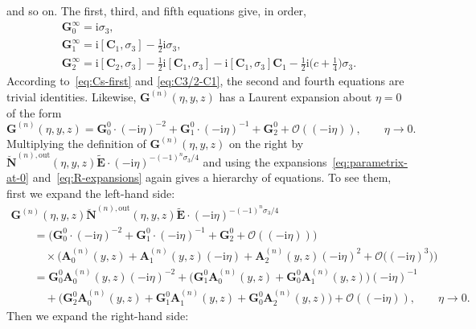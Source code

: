\documentclass[11pt]{article}
\numberwithin{equation}{section}
\numberwithin{equation}{section}
\begin{document}
and so on. The first, third, and fifth equations give, in order,
\begin{gather*}
\mathbf{G}_0^\infty=\mathrm{i}\sigma_3,\\
\mathbf{G}_1^\infty=\mathrm{i}[\mathbf{C}_1,\sigma_3]-\tfrac{1}{2}\mathrm{i}\sigma_3,\\
\mathbf{G}_2^\infty=\mathrm{i}[\mathbf{C}_2,\sigma_3]-\tfrac{1}{2}\mathrm{i}[\mathbf{C}_1,\sigma_3]-\mathrm{i}[\mathbf{C}_1,\sigma_3]\mathbf{C}_1-\tfrac{1}{2}\mathrm{i}\bigl(c+\tfrac{1}{4}\bigr)\sigma_3.
\end{gather*}
According to~\eqref{eq:Cs-first} and \eqref{eq:C3/2-C1}, the second and fourth equations are trivial identities. Likewise, $\mathbf{G}^{(n)}(\eta,y,z)$ has a Laurent expansion about $\eta=0$ of the form
\begin{equation*}
\mathbf{G}^{(n)}(\eta,y,z)=\mathbf{G}^0_0\cdot (-\mathrm{i}\eta)^{-2} +\mathbf{G}^0_1\cdot (-\mathrm{i}\eta)^{-1} + \mathbf{G}^0_2 + \mathcal{O}((-\mathrm{i}\eta)),\qquad\eta\to 0.
\end{equation*}
Multiplying the definition of $\mathbf{G}^{(n)}(\eta,y,z)$ on the right by $\breve{\mathbf{N}}^{(n),\mathrm{out}}(\eta,y,z)\widetilde{\mathbf{E}}\cdot(-\mathrm{i}\eta)^{-(-1)^n\sigma_3/4}$ and using the expansions~\eqref{eq:parametrix-at-0} and~\eqref{eq:R-expansions} again gives a hierarchy of equations. To see them, first we expand the left-hand side:
\begin{gather*}
\mathbf{G}^{(n)}(\eta,y,z)\breve{\mathbf{N}}^{(n),\mathrm{out}}(\eta,y,z)\widetilde{\mathbf{E}}\cdot(-\mathrm{i}\eta)^{-(-1)^n\sigma_3/4}\\
\qquad{}=\bigl(\mathbf{G}^0_0\cdot (-\mathrm{i}\eta)^{-2} +\mathbf{G}^0_1\cdot (-\mathrm{i}\eta)^{-1} + \mathbf{G}^0_2 + \mathcal{O}((-\mathrm{i}\eta))\bigr)\\
\qquad\quad{}\times\bigl(\mathbf{A}_0^{(n)}(y,z) + \mathbf{A}_1^{(n)}(y,z)(-\mathrm{i}\eta) + \mathbf{A}_2^{(n)}(y,z)(-\mathrm{i}\eta)^2 + \mathcal{O}\bigl((-\mathrm{i}\eta)^3\bigr)\bigr)\\
\qquad{}=\mathbf{G}_0^0\mathbf{A}_0^{(n)}(y,z)(-\mathrm{i}\eta)^{-2} + \bigl(\mathbf{G}_1^0\mathbf{A}_0^{(n)}(y,z) + \mathbf{G}_0^0\mathbf{A}_1^{(n)}(y,z)\bigr)(-\mathrm{i}\eta)^{-1} \\
\qquad\quad{}+
\bigl(\mathbf{G}_2^0\mathbf{A}_0^{(n)}(y,z) + \mathbf{G}_1^0\mathbf{A}_1^{(n)}(y,z) + \mathbf{G}_0^0\mathbf{A}_2^{(n)}(y,z)\bigr) + \mathcal{O}((-\mathrm{i}\eta)),\qquad\eta\to 0.
\end{gather*}
Then we expand the right-hand side:
\end{document}
